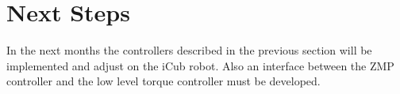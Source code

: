 \section{Next Steps}
In the next months the controllers described in the previous section will be implemented and
adjust on the iCub robot.
Also an interface between the ZMP controller and the low level torque controller must be
developed.
